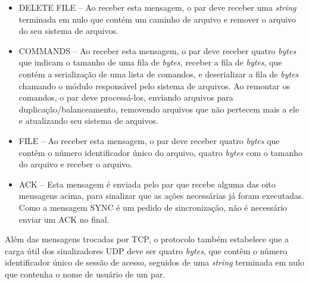 \documentclass{article}
\begin{document}
\begin{itemize}
	\item DELETE FILE -- Ao receber esta mensagem, o par deve receber uma \textit{string} terminada em nulo que contém um caminho de arquivo e remover o arquivo do seu sistema de arquivos.
	\item COMMANDS -- Ao receber esta mensagem, o par deve receber quatro \textit{bytes} que indicam o tamanho de uma fila de \textit{bytes}, receber a fila de \textit{bytes}, que contém a serialização de uma lista de comandos, e deserializar a fila de \textit{bytes} chamando o módulo responsável pelo sistema de arquivos. Ao remontar os comandos, o par deve processá-los, enviando arquivos para duplicação/balanceamento, removendo arquivos que não pertecem mais a ele e atualizando seu sistema de arquivos.
	\item FILE -- Ao receber esta mensagem, o par deve receber quatro \textit{bytes} que contêm o número identificador único do arquivo, quatro \textit{bytes} com o tamanho do arquivo e receber o arquivo.
	\item ACK -- Esta mensagem é enviada pelo par que recebe alguma das oito mensagens acima, para sinalizar que as ações necessárias já foram executadas. Como a mensagem SYNC é um pedido de sincronização, não é necessário enviar um ACK no final.
\end{itemize}

Além das mensagens trocadas por TCP, o protocolo também estabelece que a carga útil dos sinalizadores UDP deve ser quatro \textit{bytes}, que contêm o número identificador único de sessão de acesso, seguidos de uma \textit{string} terminada em nulo que contenha o nome de usuário de um par.
\end{document}
